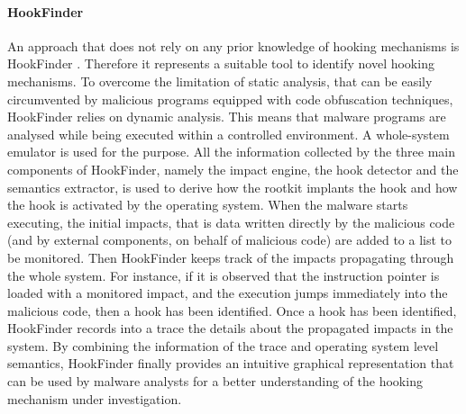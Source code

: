 \paragraph{HookFinder}
An approach that does not rely on any prior knowledge of hooking mechanisms is HookFinder \cite{hookfinder}. Therefore it represents a suitable tool to identify novel hooking mechanisms. To overcome the limitation of static analysis, that can be easily circumvented by malicious programs equipped with code obfuscation techniques, HookFinder relies on dynamic analysis. This means that malware programs are analysed while being executed within a controlled environment. A whole-system emulator is used for the purpose. All the information collected by the three main components of HookFinder, namely the impact engine, the hook detector and the semantics extractor, is used to derive how the rootkit implants the hook and how the hook is activated by the operating system. When the malware starts executing, the initial impacts, that is data written directly by the malicious code (and by external components, on behalf of malicious code) are added to a list to be monitored. Then HookFinder keeps track of the impacts propagating through the whole system. For instance, if it is observed that the instruction pointer is loaded with a monitored impact, and the execution jumps immediately into the malicious code, then a hook has been identified.
Once a hook has been identified, HookFinder records into a trace the details about the propagated impacts in the system. By combining the information of the trace and operating system level semantics, HookFinder finally provides an intuitive graphical representation that can be used by malware analysts for a better understanding of the hooking mechanism under investigation.



